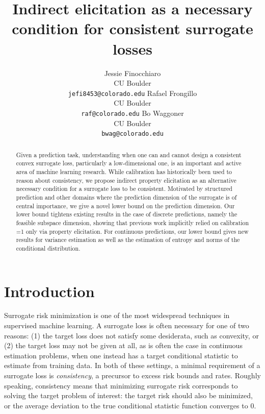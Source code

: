 \documentclass{article}
\title{Indirect elicitation as a necessary condition for consistent surrogate losses}
\author{%
  Jessie Finocchiaro\\
  CU Boulder\\
  \texttt{jefi8453@colorado.edu} 
  \And
   Rafael Frongillo\\
   CU Boulder\\
   \texttt{raf@colorado.edu} 
   \And
   Bo Waggoner\\
   CU Boulder \\
   \texttt{bwag@colorado.edu} 
}
\newcommand{\Comments}{1}
\newcommand{\mytodo}[2]{\ifnum\Comments=1%
	\todo[linecolor=#1!80!black,backgroundcolor=#1,bordercolor=#1!80!black]{#2}\fi}
\newcommand{\botodo}[1]{\mytodo{blue!20!white}{Bo: #1}}
\begin{document}
\maketitle

\begin{abstract}
Given a prediction task, understanding when one can and cannot design a consistent convex surrogate loss, particularly a low-dimensional one, is an important and active area of machine learning research. 
While calibration has historically been used to reason about consistency, we propose indirect property elicitation as an alternative necessary condition for a surrogate loss to be consistent. 
Motivated by structured prediction and other domains where the prediction dimension of the surrogate is of central importance, we give a novel lower bound on the prediction dimension. 
Our lower bound tightens existing results in the case of discrete predictions, namely the feasible subspace dimension, showing that previous work implicitly relied on calibration \botodo{TODO} only via property elicitation. 
For continuous predictions, our lower bound gives new results for variance estimation as well as the estimation of entropy and norms of the conditional distribution.
\end{abstract}

\section{Introduction}\label{sec:intro}

Surrogate risk minimization is one of the most widespread techniques in supervised machine learning.
A surrogate loss is often necessary for one of two reasons: (1) the target loss does not satisfy some desiderata, such as convexity, or (2) the target loss may not be given at all, as is often the case in continuous estimation problems, when one instead has a target conditional statistic to estimate from training data.
In both of these settings, a minimal requirement of a surrogate loss is \emph{consistency}, a precursor to excess risk bounds and rates.
Roughly speaking, consistency means that minimizing surrogate risk corresponds to solving the target problem of interest:
the target risk should also be minimized, or the average deviation to the true conditional statistic function converges to 0.
\end{document}

